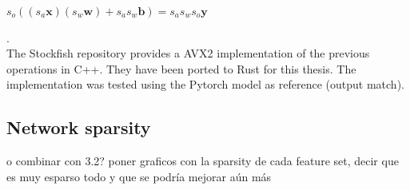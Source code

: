 \vspace{1cm}
$s_o ((s_a \bm{x}) (s_w \bm{w}) + s_a s_w \bm{b}) = s_a s_w s_o \bm{y}$

. \\

The Stockfish repository provides a AVX2 implementation of the previous operations in C++. They have been ported to Rust for this thesis. The implementation was tested using the Pytorch model as reference (output match).

\subsection{Network sparsity}

o combinar con 3.2?
poner graficos con la sparsity de cada feature set, decir que es muy esparso todo y que se podría mejorar aún más

